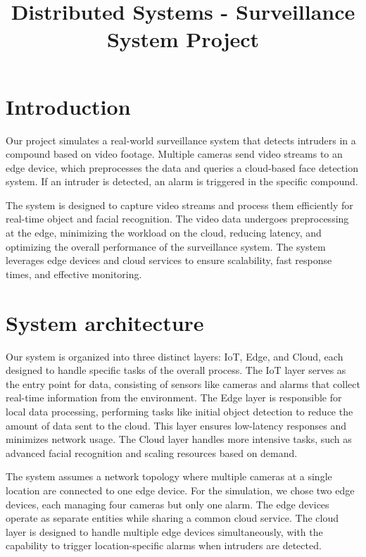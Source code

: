 \documentclass[conference]{IEEEtran}
\begin{document}
\title{Distributed Systems - Surveillance System Project}

\author{
\and
{}
\and
{}
}

\maketitle

\section{Introduction}
Our project simulates a real-world surveillance system that detects intruders in a compound based on video footage. Multiple cameras send video streams to an edge device, which preprocesses the data and queries a cloud-based face detection system. If an intruder is detected, an alarm is triggered in the specific compound.

The system is designed to capture video streams and process them efficiently for real-time object and facial recognition. The video data undergoes preprocessing at the edge, minimizing the workload on the cloud, reducing latency, and optimizing the overall performance of the surveillance system. The system leverages edge devices and cloud services to ensure scalability, fast response times, and effective monitoring.  

\section{System architecture}
Our system is organized into three distinct layers: IoT, Edge, and Cloud, each designed to handle specific tasks of the overall process. The IoT layer serves as the entry point for data, consisting of sensors like cameras and alarms that collect real-time information from the environment. The Edge layer is responsible for local data processing, performing tasks like initial object detection to reduce the amount of data sent to the cloud. This layer ensures low-latency responses and minimizes network usage. The Cloud layer handles more intensive tasks, such as advanced facial recognition and scaling resources based on demand. 

The system assumes a network topology where multiple cameras at a single location are connected to one edge device. For the simulation, we chose two edge devices, each managing four cameras but only one alarm. The edge devices operate as separate entities while sharing a common cloud service. The cloud layer is designed to handle multiple edge devices simultaneously, with the capability to trigger location-specific alarms when intruders are detected.
\end{document}
